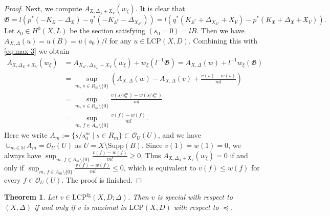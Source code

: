 \documentclass[reqno, 12pt]{amsart}
\newtheorem{thm}[prop]{Theorem}
\theoremstyle{definition}
\newcommand{\bA}{\mathbb{A}}
\newcommand{\bN}{\mathbb{N}}
\newcommand{\cO}{\mathcal{O}}
\newcommand{\Supp}{\mathrm{Supp}}
\newcommand{\fX}{\mathfrak{X}}
\newcommand{\fG}{\mathfrak{G}}
\newcommand{\LCP}{\mathrm{LCP}}
\numberwithin{equation}{section}
\begin{document}
\begin{proof}
Next, we compute $A_{\fX, \Delta_{\fX}+\fX_{V}}(w_{\xi})$. It is clear that 
\[
\fG = l (p^*(-K_{\fX}-\Delta_{\fX})- q^*(-K_{\bA^r} - \Delta_{X_{\bA^r}})) = l(q^*(K_{\bA^r} + \Delta_{X_{\bA^r}} +X_{V})-p^*(K_{\fX}+\Delta_{\fX}+\fX_V)).
\]
Let $s_0\in H^0(X,L)$ be the section satisfying $(s_0=0) = lB$. Then we have $A_{X,\Delta}(u) = u(B) = u(s_0)/l$ for any $u\in \LCP(X,D)$. Combining this with \eqref{eq:max-3} we obtain
\begin{align*}
A_{\fX, \Delta_{\fX}+\fX_{V}}(w_{\xi})&  = A_{X_{\bA^r}, \Delta_{X_{\bA^r}} +X_{V}}(w_{\xi}) + w_{\xi}(l^{-1} \fG) = A_{X,\Delta}(w) + l^{-1} w_{\xi}(\fG) \\
& = \sup_{m,\,s\in R_m\setminus\{0\}} \left(A_{X,\Delta}(w) - A_{X,\Delta}(v) + \frac{v(s)-w(s)}{ml}\right)\\
& = \sup_{m,\,s\in R_m\setminus\{0\}} \frac{v(s/s_0^m) - w(s/s_0^m)}{ml}\\
& = \sup_{m,\, f\in A_m\setminus\{0\}} \frac{v(f) - w(f)}{ml}.
\end{align*}
Here we write $A_m := \{ s/s_0^m \mid s\in R_m\} \subset \cO_U(U)$, and we have $\cup_{m\in \bN} A_m = \cO_U(U)$ as $U = X\setminus \Supp(B)$. 
Since $v(1) = w(1) =0$, we always have $\sup_{m,\, f\in A_m\setminus\{0\}} \frac{v(f) - w(f)}{ml}\geq 0$. Thus 
$A_{\fX, \Delta_{\fX}+\fX_{V}}(w_{\xi}) = 0$ if and only if $\sup_{m,\, f\in A_m\setminus\{0\}} \frac{v(f) - w(f)}{ml} \leq 0$, which is equivalent to $v(f) \leq w(f)$ for every $f\in \cO_U(U)$. The proof is finished.
\end{proof}

\begin{thm}\label{thm:maximal-special}
Let $v\in \LCP^{\mathrm{fg}}(X,D;\Delta)$. Then $v$ is special
with respect to $(X,\Delta)$ if and only if $v$ is maximal in
$\LCP(X,D)$ with respect to $\preceq$.
\end{thm}
\end{document}
